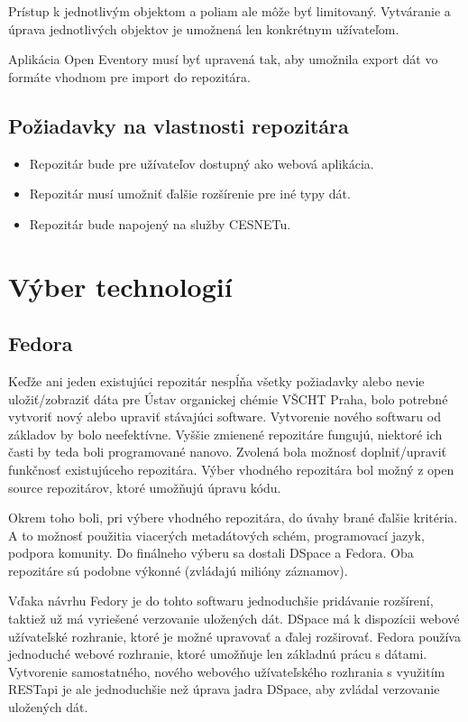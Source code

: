 \documentclass[thesis=M,slovak]{FITthesis}[2013/05/06]
\begin{document}
Prístup k jednotlivým objektom a poliam ale môže byť limitovaný. Vytváranie a úprava jednotlivých objektov je umožnená len konkrétnym užívateľom.

Aplikácia Open Eventory musí byť upravená tak, aby umožnila export dát vo formáte vhodnom pre import do repozitára.

\subsection{Požiadavky na vlastnosti repozitára}
\begin{itemize}
	\item Repozitár bude pre užívateľov dostupný ako webová aplikácia.
	\item Repozitár musí umožniť ďalšie rozšírenie pre iné typy dát.
	\item Repozitár bude napojený na služby CESNETu.
\end{itemize}

\section{Výber technologií}
\subsection{Fedora}
Keďže ani jeden existujúci repozitár nespĺňa všetky požiadavky alebo nevie uložiť/zobraziť dáta pre Ústav organickej chémie VŠCHT Praha, bolo potrebné vytvoriť nový alebo upraviť stávajúci software. Vytvorenie nového softwaru od základov by bolo neefektívne. Vyššie zmienené repozitáre fungujú, niektoré ich časti by teda boli programované nanovo. Zvolená bola možnosť doplniť/upraviť funkčnosť existujúceho repozitára. Výber vhodného repozitára bol možný z open source repozitárov, ktoré umožňujú úpravu kódu.

Okrem toho boli, pri výbere vhodného repozitára, do úvahy brané ďalšie kritéria. A to možnosť použitia viacerých metadátových schém, programovací jazyk, podpora komunity. Do finálneho výberu sa dostali DSpace a Fedora. Oba repozitáre sú podobne výkonné (zvládajú milióny záznamov).

Vďaka návrhu Fedory je do tohto softwaru jednoduchšie pridávanie rozšírení, taktiež už má vyriešené verzovanie uložených dát. DSpace má k dispozícii webové užívateľské rozhranie, ktoré je možné upravovať a ďalej rozširovať. Fedora používa jednoduché webové rozhranie, ktoré umožňuje len základnú prácu s dátami. Vytvorenie samostatného, nového webového užívateľského rozhrania s využitím RESTapi je ale jednoduchšie než úprava jadra DSpace, aby zvládal verzovanie uložených dát.
\end{document}
